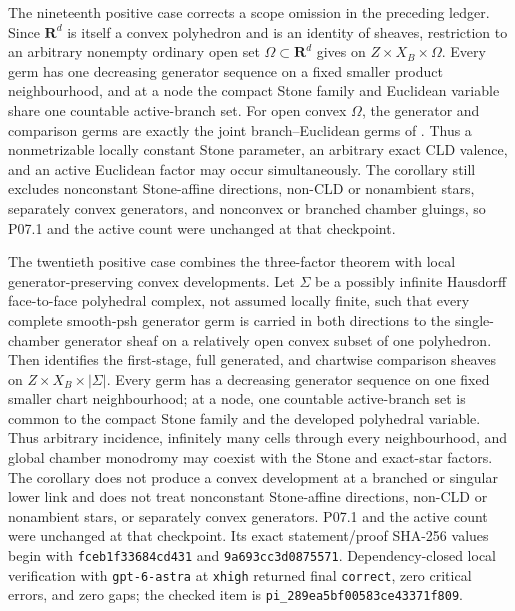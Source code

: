 The nineteenth positive case corrects a scope omission in the preceding
ledger.  Since \(\mathbf R^d\) is itself a convex polyhedron and
 is an identity of
sheaves, restriction to an arbitrary nonempty ordinary open set
\(\Omega\subset\mathbf R^d\) gives
 on
\(Z\times X_B\times\Omega\).  Every germ has one decreasing generator
sequence on a fixed smaller product neighbourhood, and at a node the compact
Stone family and Euclidean variable share one countable active-branch set.
For open convex \(\Omega\), the generator and comparison germs are exactly the
joint branch--Euclidean germs of
.  Thus a nonmetrizable
locally constant Stone parameter, an arbitrary exact CLD valence, and an
active Euclidean factor may occur simultaneously.  The corollary still
excludes nonconstant Stone-affine directions, non-CLD or nonambient stars,
separately convex generators, and nonconvex or branched chamber gluings, so
P07.1 and the active count were unchanged at that checkpoint.

The twentieth positive case combines the three-factor theorem with local
generator-preserving convex developments.  Let \(\Sigma\) be a possibly
infinite Hausdorff face-to-face polyhedral complex, not assumed locally
finite, such that every complete smooth-psh generator germ is carried in
both directions to the single-chamber generator sheaf on a relatively open
convex subset of one polyhedron.  Then
 identifies the
first-stage, full generated, and chartwise comparison sheaves on
\(Z\times X_B\times|\Sigma|\).  Every germ has a decreasing generator
sequence on one fixed smaller chart neighbourhood; at a node, one countable
active-branch set is common to the compact Stone family and the developed
polyhedral variable.  Thus arbitrary incidence, infinitely many cells
through every neighbourhood, and global chamber monodromy may coexist with
the Stone and exact-star factors.  The corollary does not produce a convex
development at a branched or singular lower link and does not treat
nonconstant Stone-affine directions, non-CLD or nonambient stars, or
separately convex generators.  P07.1 and the active count were unchanged at that checkpoint.
Its exact statement/proof SHA-256 values begin with
\texttt{fceb1f33684cd431} and \texttt{9a693cc3d0875571}.
Dependency-closed local verification with \texttt{gpt-6-astra} at
\texttt{xhigh} returned final \texttt{correct}, zero critical errors, and
zero gaps; the checked item is
\texttt{pi\_289ea5bf00583ce43371f809}.


